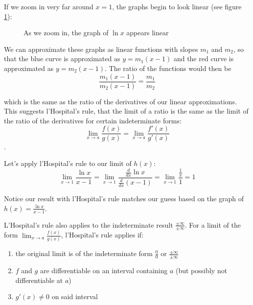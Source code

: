 If we zoom in very far around $x=1$, the graphs begin to look linear (see 
figure \ref{fig:zoom2}):

\begin{figure}[htbp]
\centering
{}
\caption{As we zoom in, the graph of $\ln{x}$ appears linear}
\label{fig:zoom2}
\end{figure}

We can approximate these graphs as linear functions with slopes $m_1$ and 
$m_2$, so that the blue curve is approximated as $y=m_1(x-1)$ and the red 
curve is approximated as $y=m_2(x-1)$. The ratio of the functions would then 
be 
$$\frac{m_1(x-1)}{m_2(x-1)}=\frac{m_1}{m_2}$$ 

which is the same as the ratio of the derivatives of our linear approximations. 
This suggests l'Hospital's rule, that the limit of a ratio is the same as the 
limit of the ratio of the derivatives for certain indeterminate forms: 
$$\lim_{x\to a}\frac{f(x)}{g(x)}=\lim_{x\to a}\frac{f'(x)}{g'(x)}$$.

Let's apply l'Hospital's rule to our limit of $h(x)$:
$$\lim_{x\to 1} \frac{\ln{x}}{x - 1} = \lim_{x \to 1} \frac{\frac{d}{dx} 
\ln{x}}{\frac{d}{dx} (x - 1)} = \lim_{x \to 1} \frac{\frac{1}{x}}{1}=1$$

Notice our result with l'Hospital's rule matches our guess based on the graph 
of $h(x) = \frac{\ln{x}}{x-1}$. 

L'Hospital's rule also applies to the indeterminate result $\frac{\pm \infty}
{\pm \infty}$. For a limit of the form $\lim_{x\to a}\frac{f(x)}{g(x)}$, 
l'Hospital's rule applies if:
\begin{enumerate}
    \item the original limit is of the indeterminate form $\frac{0}{0}$ or 
    $\frac{\pm \infty}{\pm \infty}$
    \item $f$ and $g$ are differentiable on an interval containing $a$ (but 
    possibly not differentiable at $a$)
    \item $g'(x) \neq 0$ on said interval
\end{enumerate}

